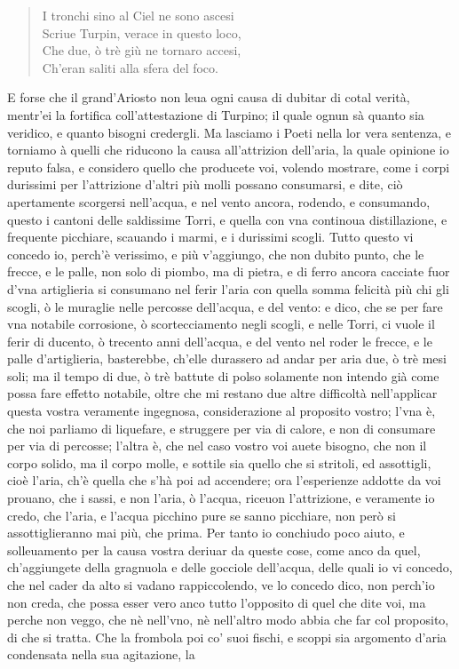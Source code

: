 \documentclass[11pt,twoside,openany]{book}
\begin{document}
\begin{verse}

I tronchi sino al Ciel ne sono ascesi \\

Scriue Turpin, verace in questo loco, \\

Che due, ò trè giù ne tornaro accesi, \\

Ch'eran saliti alla sfera del foco. \\

\end{verse}

E forse che il grand'Ariosto non leua ogni causa di dubitar di cotal verità, mentr'ei la fortifica coll'attestazione di Turpino; il quale ognun sà quanto sia veridico, e quanto bisogni credergli. Ma lasciamo i Poeti nella lor vera sentenza, e torniamo à quelli che riducono la causa all'attrizion dell'aria, la quale opinione io reputo falsa, e considero quello che producete voi, volendo mostrare, come i corpi durissimi per l'attrizione d'altri più molli possano consumarsi, e dite, ciò apertamente scorgersi nell'acqua, e nel vento ancora, rodendo, e consumando, questo i cantoni delle saldissime Torri, e quella con vna continoua distillazione, e frequente picchiare, scauando i marmi, e i durissimi scogli. Tutto questo vi concedo io, perch'è verissimo, e più v'aggiungo, che non dubito punto, che le frecce, e le palle, non solo di piombo, ma di pietra, e di ferro ancora cacciate fuor d'vna artiglieria si consumano nel ferir l'aria con quella somma felicità più chi gli scogli, ò le muraglie nelle percosse dell'acqua, e del vento: e dico, che se per fare vna notabile corrosione, ò scortecciamento negli scogli, e nelle Torri, ci vuole il ferir di ducento, ò trecento anni dell'acqua, e del vento nel roder le frecce, e le palle d'artiglieria, basterebbe, ch'elle durassero ad andar per aria due, ò trè mesi soli; ma il tempo di due, ò trè battute di polso solamente non intendo già come possa fare effetto notabile, oltre che mi restano due altre difficoltà nell'applicar questa vostra veramente ingegnosa, considerazione al proposito vostro; l'vna è, che noi parliamo di liquefare, e struggere per via di calore, e non di consumare per via di percosse; l'altra è, che nel caso vostro voi auete bisogno, che non il corpo solido, ma il corpo molle, e sottile sia quello che si stritoli, ed assottigli, cioè l'aria, ch'è quella che s'hà poi ad accendere; ora l'esperienze addotte da voi prouano, che i sassi, e non l'aria, ò l'acqua, riceuon l'attrizione, e veramente io credo, che l'aria, e l'acqua picchino pure se sanno picchiare, non però si assottiglieranno mai più, che prima. Per tanto io conchiudo poco aiuto, e solleuamento per la causa vostra deriuar da queste cose, come anco da quel, ch'aggiungete della gragnuola e delle gocciole dell'acqua, delle quali io vi concedo, che nel cader da alto si vadano rappiccolendo, ve lo concedo dico, non perch'io non creda, che possa esser vero anco tutto l'opposito di quel che dite voi, ma perche non veggo, che nè nell'vno, nè nell'altro modo abbia che far col proposito, di che si tratta. Che la frombola poi co' suoi fischi, e scoppi sia argomento d'aria condensata nella sua agitazione, la 
\end{document}
